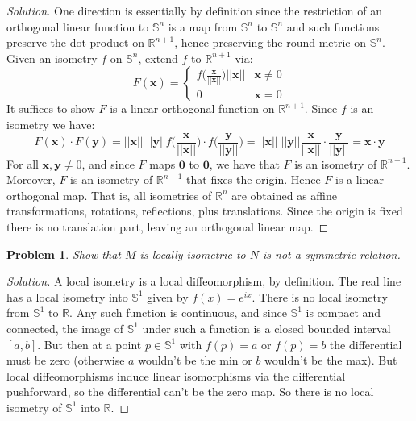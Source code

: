 \documentclass{article}
\theoremstyle{normal}
\newtheorem{problem}{Problem}
\begin{document}
    \begin{proof}[Solution]
        One direction is essentially by definition since the restriction of
        an orthogonal linear function to $\mathbb{S}^{n}$ is a map from
        $\mathbb{S}^{n}$ to $\mathbb{S}^{n}$ and such functions preserve the
        dot product on $\mathbb{R}^{n+1}$, hence preserving the round metric
        on $\mathbb{S}^{n}$. Given an isometry $f$ on $\mathbb{S}^{n}$, extend
        $f$ to $\mathbb{R}^{n+1}$ via:
        \begin{equation}
            F(\mathbf{x})=
            \begin{cases}
                f\Big(\frac{\mathbf{x}}{||\mathbf{x}||}\Big)||\mathbf{x}||
                    &\mathbf{x}\ne{0}\\
                0&\mathbf{x}=0
            \end{cases}
        \end{equation}
        It suffices to show $F$ is a linear orthogonal function on
        $\mathbb{R}^{n+1}$. Since $f$ is an isometry we have:
        \begin{equation}
            F(\mathbf{x})\cdot{F}(\mathbf{y})=
                ||\mathbf{x}||\;||\mathbf{y}||
                f\Big(\frac{\mathbf{x}}{||\mathbf{x}||}\Big)\cdot
                f\Big(\frac{\mathbf{y}}{||\mathbf{y}||}\Big)
            =||\mathbf{x}||\;||\mathbf{y}||
                \frac{\mathbf{x}}{||\mathbf{x}||}\cdot
                \frac{\mathbf{y}}{||\mathbf{y}||}
            =\mathbf{x}\cdot\mathbf{y}
        \end{equation}
        For all $\mathbf{x},\mathbf{y}\ne{0}$, and since $F$ maps
        $\mathbf{0}$ to $\mathbf{0}$, we have that $F$ is an isometry of
        $\mathbb{R}^{n+1}$. Moreover, $F$ is an isometry of $\mathbb{R}^{n+1}$
        that fixes the origin. Hence $F$ is a linear orthogonal map. That is,
        all isometries of $\mathbb{R}^{n}$ are obtained as affine transformations,
        rotations, reflections, plus translations. Since the origin is fixed
        there is no translation part, leaving an orthogonal linear map.
    \end{proof}
    \begin{problem}
        Show that $M$ \textit{is locally isometric to} $N$ is not a symmetric
        relation.
    \end{problem}
    \begin{proof}[Solution]
        A local isometry is a local diffeomorphism, by definition. The
        real line has a local isometry into $\mathbb{S}^{1}$ given by
        $f(x)=e^{ix}$. There is no local isometry from $\mathbb{S}^{1}$ to
        $\mathbb{R}$. Any such function is continuous, and since
        $\mathbb{S}^{1}$ is compact and connected, the image of $\mathbb{S}^{1}$
        under such a function is a closed bounded interval $[a,b]$. But then at
        a point $p\in\mathbb{S}^{1}$ with $f(p)=a$ or $f(p)=b$ the differential
        must be zero (otherwise $a$ wouldn't be the min or $b$ wouldn't be the
        max). But local diffeomorphisms induce linear isomorphisms via the
        differential pushforward, so the differential can't be the zero map.
        So there is no local isometry of $\mathbb{S}^{1}$ into $\mathbb{R}$.
    \end{proof}
\end{document}
